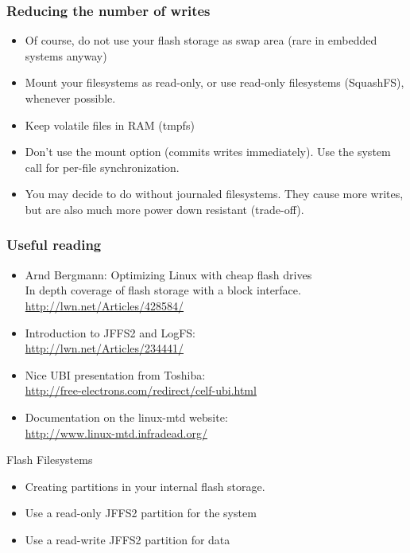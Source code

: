 \begin{frame}
  \frametitle{Reducing the number of writes}
  \begin{itemize}
  \item Of course, do not use your flash storage as swap area (rare in
    embedded systems anyway)
  \item Mount your filesystems as read-only, or use read-only
    filesystems (SquashFS), whenever possible.
  \item Keep volatile files in RAM (tmpfs)
  \item Don't use the  mount option (commits writes
    immediately). Use the  system call for per-file
    synchronization.
  \item You may decide to do without journaled filesystems. They cause
    more writes, but are also much more power down resistant
    (trade-off).
  \end{itemize}
\end{frame}

\begin{frame}
  \frametitle{Useful reading}
  \begin{itemize}
  \item Arnd Bergmann: Optimizing Linux with cheap flash drives\\
    In depth coverage of flash storage with a block interface.\\
    \url{http://lwn.net/Articles/428584/}
  \item Introduction to JFFS2 and LogFS:\\
    \url{http://lwn.net/Articles/234441/}
  \item Nice UBI presentation from Toshiba:\\
    \url{http://free-electrons.com/redirect/celf-ubi.html}
  \item Documentation on the linux-mtd website:\\
    \url{http://www.linux-mtd.infradead.org/}
  \end{itemize}
\end{frame}

\setuplabframe
{Flash Filesystems}
{
  \begin{itemize}
  \item Creating partitions in your internal flash storage.
  \item Use a read-only JFFS2 partition for the system
  \item Use a read-write JFFS2 partition for data
  \end{itemize}
}
